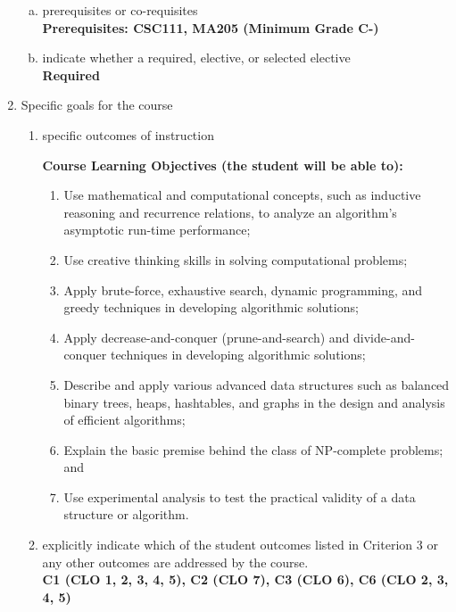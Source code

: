\begin{enumerate}[1.]
\begin{enumerate}[a.]
\item prerequisites or co-requisites\\
  {\bfseries
    Prerequisites: CSC111, MA205 (Minimum Grade C-)
  }

\item indicate whether a required, elective, or selected elective\\ %
  {\bfseries
    Required
  }

\end{enumerate}

\item Specific goals for the course
\begin{enumerate}
\item specific outcomes of instruction\\ %
  {\bfseries
    Course Learning Objectives (the student will be able to):
\begin{enumerate}[1.]
\item Use mathematical and computational concepts, such as inductive reasoning and recurrence relations, to analyze an algorithm's asymptotic run-time performance;
\item Use creative thinking skills in solving computational problems;
\item Apply brute-force, exhaustive search, dynamic programming, and greedy techniques in developing algorithmic solutions;
\item Apply decrease-and-conquer (prune-and-search) and divide-and-conquer techniques in developing
algorithmic solutions;
\item Describe and apply various advanced data structures such as balanced binary trees, heaps,
hashtables, and graphs in the design and analysis of efficient algorithms;
\item Explain the basic premise behind the class of NP-complete problems; and
\item Use experimental analysis to test the practical validity of a data structure or algorithm.
\end{enumerate}
  }

\item explicitly indicate which of the student outcomes listed in Criterion 3 or any other outcomes are addressed by the course.\\
  {\bfseries
    C1 (CLO 1, 2, 3, 4, 5),
    C2 (CLO 7),
    C3 (CLO 6),
    C6 (CLO 2, 3, 4, 5)
  }
\end{enumerate}


\end{enumerate}
